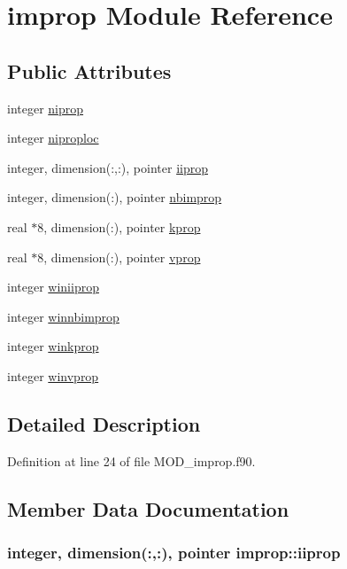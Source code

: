 \hypertarget{classimprop}{\section{improp Module Reference}
\label{classimprop}
}
\subsection*{Public Attributes}
\begin{DoxyCompactItemize}
\item 
integer \hyperlink{classimprop_ad971cf9ff05f047d4499245e5fb050e5}{niprop}
\item 
integer \hyperlink{classimprop_a35013e9b32a8f1d00648077dd425cef5}{niproploc}
\item 
integer, dimension(\-:,\-:), pointer \hyperlink{classimprop_a0e48fc80cdc0a7a76cd5d1e44c20d8f8}{iiprop}
\item 
integer, dimension(\-:), pointer \hyperlink{classimprop_a6d51b179690408640548aa63aa67c1eb}{nbimprop}
\item 
real $\ast$8, dimension(\-:), pointer \hyperlink{classimprop_a0181469b731b00c3cba35d2231e410d1}{kprop}
\item 
real $\ast$8, dimension(\-:), pointer \hyperlink{classimprop_a6963ad43d496c261b9ab603a0d029134}{vprop}
\item 
integer \hyperlink{classimprop_a8c56319e755a1db0df931ca8a381cf30}{winiiprop}
\item 
integer \hyperlink{classimprop_afebdf157fb38d068fb62f4670bae8a79}{winnbimprop}
\item 
integer \hyperlink{classimprop_aebe3bf6448d31fd57415c218577a7ab6}{winkprop}
\item 
integer \hyperlink{classimprop_a78ffdd739524a23736dc1727b1668619}{winvprop}
\end{DoxyCompactItemize}


\subsection{Detailed Description}


Definition at line 24 of file M\-O\-D\-\_\-improp.\-f90.



\subsection{Member Data Documentation}
\hypertarget{classimprop_a0e48fc80cdc0a7a76cd5d1e44c20d8f8}{
\subsubsection[{iiprop}]{\setlength{\rightskip}{0pt plus 5cm}integer, dimension(\-:,\-:), pointer improp\-::iiprop}}\label{classimprop_a0e48fc80cdc0a7a76cd5d1e44c20d8f8}


